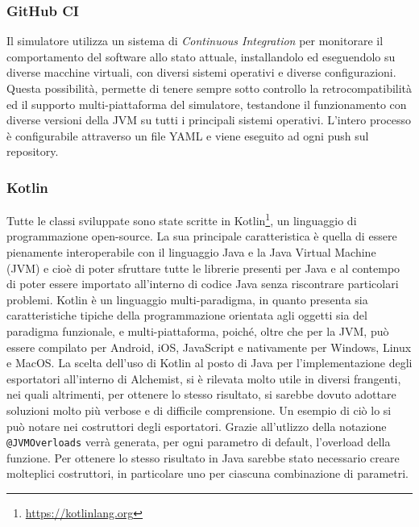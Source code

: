 \documentclass[12pt,a4paper,openright,oneside]{book}
\begin{document}
    \subsubsection{GitHub CI}
    Il simulatore utilizza un sistema di \textit{Continuous Integration} per monitorare il comportamento del software allo stato attuale, installandolo ed eseguendolo su diverse macchine virtuali, con diversi sistemi operativi e diverse configurazioni.
    Questa possibilità, permette di tenere sempre sotto controllo la retrocompatibilità ed il supporto multi-piattaforma del simulatore, testandone il funzionamento con diverse versioni della JVM su tutti i principali sistemi operativi. L'intero processo è configurabile attraverso un file YAML e viene eseguito ad ogni push sul repository.
    
    \subsubsection{\textbf{Kotlin}}
    Tutte le classi sviluppate sono state scritte in Kotlin\footnote{\url{https://kotlinlang.org}}, un linguaggio di programmazione open-source.
    La sua principale caratteristica è quella di essere pienamente interoperabile con il linguaggio Java e la Java Virtual Machine (JVM) e cioè di poter sfruttare tutte le librerie presenti per Java e al contempo di poter essere importato all’interno di codice Java senza riscontrare particolari problemi.
    Kotlin è un linguaggio multi-paradigma, in quanto presenta sia caratteristiche tipiche della programmazione orientata agli oggetti sia del paradigma funzionale, e multi-piattaforma, poiché, oltre che per la JVM, può essere compilato per Android, iOS, JavaScript e nativamente per Windows, Linux e MacOS.
    La scelta dell’uso di Kotlin al posto di Java per l’implementazione degli esportatori all’interno di Alchemist, si è rilevata molto utile in diversi frangenti, nei quali altrimenti, per ottenere lo stesso risultato, si sarebbe dovuto adottare soluzioni molto più verbose e di difficile comprensione. Un esempio di ciò lo si può notare nei costruttori degli esportatori. Grazie all'utlizzo della notazione \texttt{@JVMOverloads} verrà generata, per ogni parametro di default, l’overload della funzione. Per ottenere lo stesso risultato in Java sarebbe stato necessario creare molteplici costruttori, in particolare uno per ciascuna combinazione di parametri.
    
\end{document}
